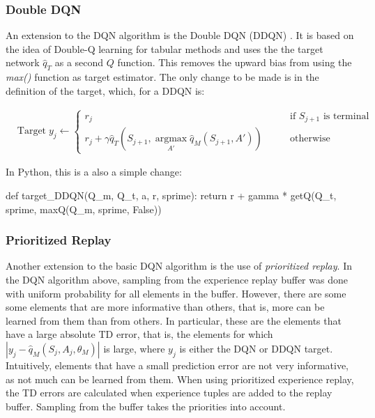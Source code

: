 \subsubsection*{Double DQN}

An extension to the DQN algorithm is the Double DQN (DDQN) . It is based on the idea of Double-Q learning for tabular methods and uses the the target network $\hat{q}_T$ as a second $Q$ function. This removes the upward bias from using the \emph{max()} function as target estimator. The only change to be made is in the definition of the target, which, for a DDQN is: 

\begin{align*}
& \text{Target}\;y_j \leftarrow \begin{cases} r_j & \qquad \text{if $S_{j+1}$ is terminal} \\
r_j + \gamma \hat{q}_T (S_{j+1}, \operatorname*{argmax}_{A'} \hat{q}_M (S_{j+1}, A') ) & \qquad \text{otherwise}\end{cases} \hspace{1in}
\end{align*}

In Python, this is a also a simple change:

\begin{pythoncode}
def target_DDQN(Q_m, Q_t, a, r, sprime):
    return r + gamma * getQ(Q_t, sprime, maxQ(Q_m, sprime, False))
\end{pythoncode}

\subsubsection*{Prioritized Replay}

Another extension to the basic DQN algorithm is the use of \emph{prioritized replay}. In the DQN algorithm above, sampling from the experience replay buffer was done with uniform probability for all elements in the buffer. However, there are some some elements that are more informative than others, that is, more can be learned from them than from others. In particular, these are the elements that have a large absolute TD error, that is, the elements for which $|y_j - \hat{q}_M (S_j, A_j, \theta_M)|$ is large, where $y_j$ is either the DQN or DDQN target. Intuitively, elements that have a small prediction error are not very informative, as not much can be learned from them. When using prioritized experience replay, the TD errors are calculated when experience tuples are added to the replay buffer. Sampling from the buffer takes the priorities into account. 

